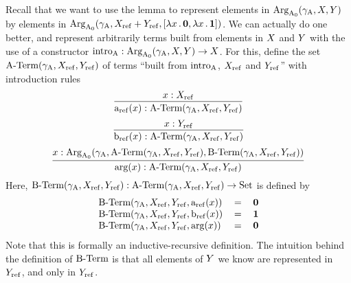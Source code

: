 \documentclass{article}
\begin{document}
Recall that we want to use the lemma to represent elements in
$\text{Arg}_{\mathrm{A}_0}(\gamma_{\mathrm{A}}, X, Y)$ by elements in $\text{Arg}_{\mathrm{A}_0}(\gamma_{\mathrm{A}}, X_{\mathrm{ref}} +Y_{\mathrm{ref}},
[\lambda x\,.\,\mathbf{0}, \lambda x\,.\,\mathbf{1}])$. We can actually do one
better, and represent arbitrarily terms built from elements in $X$ and
$Y$ with the use of a constructor $\text{intro}_{\mathrm{A}} : \text{Arg}_{\mathrm{A}_0}(\gamma_{\mathrm{A}}, X, Y) \to
X$. For this, define the set $\text{A-Term}(\gamma_{\mathrm{A}}, X_{\mathrm{ref}}, Y_{\mathrm{ref}})$ of terms
``built from $\text{intro}_{\mathrm{A}}$, $X_{\mathrm{ref}}$ and $Y_{\mathrm{ref}}$'' with introduction rules
%
\[
\infer{\termAref(x) : \Aterm(\gammaA, \Xref, \Yref)}{x : \Xref}
\]
%
%
\[
\infer{\termBref(x) : \Aterm(\gammaA, \Xref, \Yref)}{x : \Yref}
\]
%
%
\[
\infer{\termArg(x) : \Aterm(\gammaA, \Xref, \Yref)}{x : \ArgAp(\gammaA, \Aterm(\gammaA, \Xref, \Yref), \Bterm(\gammaA, \Xref, \Yref))}
\]
Here, $\text{B-Term}(\gamma_{\mathrm{A}}, X_{\mathrm{ref}}, Y_{\mathrm{ref}}) : \text{A-Term}(\gamma_{\mathrm{A}}, X_{\mathrm{ref}}, Y_{\mathrm{ref}}) \to \text{Set}$ is defined by
\[
\begin{tabular}{lcr}
$\Bterm(\gammaA, \Xref, \Yref, \termAref(x))$ & $=$ & $\zero$ \\
$\Bterm(\gammaA, \Xref, \Yref, \termBref(x))$ & $=$ & $\one$  \\
$\Bterm(\gammaA, \Xref, \Yref, \termArg(x))$  & $=$ & $\zero$
\end{tabular}
\]
Note that this is formally an inductive-recursive definition.
The intuition behind the definition of $\text{B-Term}$ is that all elements of
$Y$ we know are represented in $Y_{\mathrm{ref}}$, and only in $Y_{\mathrm{ref}}$. 
\end{document}

